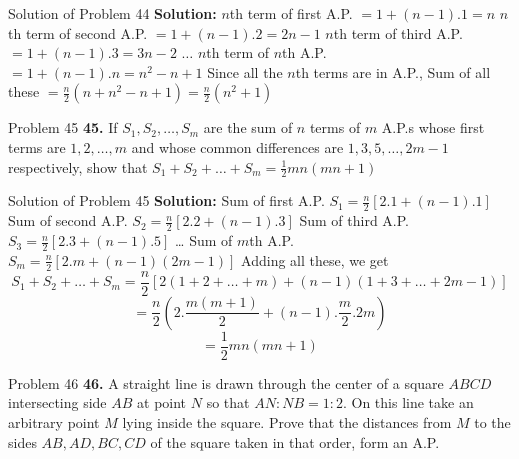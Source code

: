 \documentclass[aspectratio=1610,8pt]{beamer}
\begin{document}
\begin{frame}{Solution of Problem 44}
  \textbf{Solution:} $n$th term of first A.P. $= 1 + (n - 1).1 = n$
  \linebreak\linebreak
  $n$th term of second A.P. $= 1 + (n - 1).2 = 2n - 1$
  \linebreak\linebreak
  $n$th term of third A.P. $= 1 + (n - 1).3 = 3n - 2$
  \linebreak\linebreak
  $\ldots$
  \linebreak\linebreak
  $n$th term of $n$th A.P. $= 1 + (n - 1).n = n^2 - n + 1$
  \linebreak\linebreak
  Since all the $n$th terms are in A.P., Sum of all these $= \frac{n}{2}(n + n^2 - n + 1) = \frac{n}{2}(n^2 + 1)$
\end{frame}
\begin{frame}{Problem 45}
  \textbf{45.} If $S_1, S_2, \ldots, S_m$ are the sum of $n$ terms of $m$ A.P.s whose first terms are $1, 2, \ldots, m$ and whose
  common differences are $1, 3, 5, \ldots, 2m - 1$ respectively, show that $S_1 + S_2 + \ldots + S_m = \frac{1}{2}mn(mn + 1)$
\end{frame}
\begin{frame}{Solution of Problem 45}
  \textbf{Solution:} Sum of first A.P. $S_1 = \frac{n}{2}[2.1 + (n - 1).1]$
  \linebreak\linebreak
  Sum of second A.P. $S_2 = \frac{n}{2}[2.2 + (n - 1).3]$
  \linebreak\linebreak
  Sum of third A.P. $S_3 = \frac{n}{2}[2.3 + (n - 1).5]$
  \linebreak\linebreak
  \ldots
  \linebreak\linebreak
  Sum of $m$th A.P. $S_m = \frac{n}{2}[2.m + (n - 1)(2m - 1)]$
  \linebreak\linebreak
  Adding all these, we get
  $$S_1 + S_2 + \ldots + S_m = \frac{n}{2}[2(1 + 2 + \ldots + m) + (n - 1)(1 + 3 + \ldots + 2m - 1)]$$
  $$= \frac{n}{2}\left(2.\frac{m(m + 1)}{2} + (n - 1).\frac{m}{2}.2m\right)$$
  $$= \frac{1}{2}mn(mn + 1)$$
\end{frame}
\begin{frame}{Problem 46}
  \textbf{46.} A straight line is drawn through the center of a square $ABCD$ intersecting side $AB$ at point $N$ so that $AN:NB =
  1:2.$ On this line take an arbitrary point $M$ lying inside the square. Prove that the distances from $M$ to the sides $AB, AD,
  BC, CD$ of the square taken in that order, form an A.P.
\end{frame}
\end{document}
